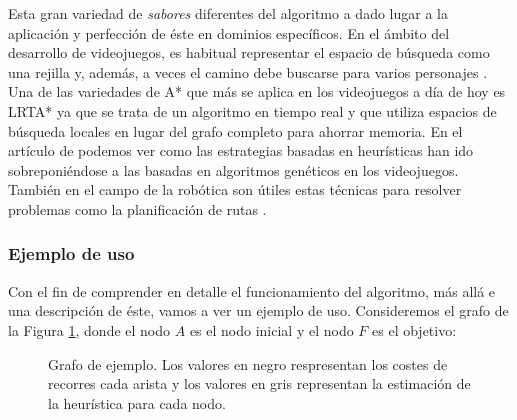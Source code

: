 \documentclass[a4paper,12pt]{article}
\begin{document}
Esta gran variedad de \textit{sabores} diferentes del algoritmo a dado lugar a la aplicación y perfección de éste en dominios específicos. En el ámbito del desarrollo de videojuegos, es habitual representar el espacio de búsqueda como una rejilla \cite{goos_grid-based_2002, harabor_online_2011, standley_complete_2011, barnouti_pathfinding_2016} y, además, a veces el camino debe buscarse para varios personajes \cite{felner_adding_2018}. Una de las variedades de A* que más se aplica en los videojuegos a día de hoy es LRTA* \cite{bulitko2006learning} ya que se trata de un algoritmo en tiempo real y que utiliza espacios de búsqueda locales en lugar del grafo completo para ahorrar memoria. En el artículo de \cite{rafiq_pathfinding_2020} podemos ver como las estrategias basadas en heurísticas han ido sobreponiéndose a las basadas en algoritmos genéticos en los videojuegos. También en el campo de la robótica son útiles estas técnicas para resolver problemas como la planificación de rutas \cite{martins_improved_2022}.

\subsubsection{Ejemplo de uso}

Con el fin de comprender en detalle el funcionamiento del algoritmo, más allá e una descripción de éste, vamos a ver un ejemplo de uso. Consideremos el grafo de la Figura \ref{fig:example}, donde el nodo $A$ es el nodo inicial y el nodo $F$ es el objetivo:

\begin{figure}[H]
\centering

\caption{Grafo de ejemplo. Los valores en negro respresentan los costes de recorres cada arista y los valores en gris representan la estimación de la heurística para cada nodo.}
\label{fig:example}
\end{figure}
\end{document}

